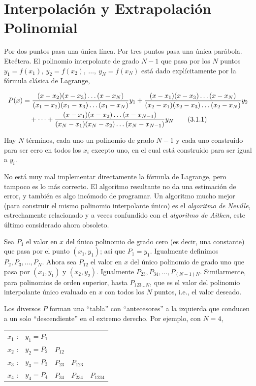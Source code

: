 \documentclass[10pt,a4paper]{book}
\begin{document}
\newpage

\section{Interpolación y Extrapolación Polinomial}

Por dos puntos pasa una única línea. Por tres puntos pasa una única parábola. Etcétera. El polinomio interpolante de grado $N - 1$ que pasa por los $N$ puntos $y_1 = f(x_1),\ y_2 = f(x_2),\ \ldots,\ y_N = f(x_N)$ está dado explícitamente por la fórmula clásica de Lagrange,

\begin{align}
P(x) &= \frac{(x - x_2)(x - x_3)\ldots(x - x_N)}{(x_1 - x_2)(x_1 - x_3)\ldots(x_1 - x_N)} y_1 
+ \frac{(x - x_1)(x - x_3)\ldots(x - x_N)}{(x_2 - x_1)(x_2 - x_3)\ldots(x_2 - x_N)} y_2 \notag \\
&\quad + \cdots + 
\frac{(x - x_1)(x - x_2)\ldots(x - x_{N-1})}{(x_N - x_1)(x_N - x_2)\ldots(x_N - x_{N-1})} y_N \tag{3.1.1}
\end{align}

Hay $N$ términos, cada uno un polinomio de grado $N - 1$ y cada uno construido para ser cero en todos los $x_i$ excepto uno, en el cual está construido para ser igual a $y_i$.

No está muy mal implementar directamente la fórmula de Lagrange, pero tampoco es lo más correcto. El algoritmo resultante no da una estimación de error, y también es algo incómodo de programar. Un algoritmo mucho mejor (para construir el mismo polinomio interpolante único) es el \textit{algoritmo de Neville}, estrechamente relacionado y a veces confundido con el \textit{algoritmo de Aitken}, este último considerado ahora obsoleto.

Sea $P_1$ el valor en $x$ del único polinomio de grado cero (es decir, una constante) que pasa por el punto $(x_1, y_1)$; así que $P_1 = y_1$. Igualmente definimos $P_2, P_3, \ldots, P_N$. Ahora sea $P_{12}$ el valor en $x$ del único polinomio de grado uno que pasa por $(x_1, y_1)$ y $(x_2, y_2)$. Igualmente $P_{23}, P_{34}, \ldots, P_{(N-1)N}$. Similarmente, para polinomios de orden superior, hasta $P_{123\ldots N}$, que es el valor del polinomio interpolante único evaluado en $x$ con todos los $N$ puntos, i.e., el valor deseado.

Los diversos $P$ forman una ``tabla'' con ``antecesores'' a la izquierda que conducen a un solo ``descendiente'' en el extremo derecho. Por ejemplo, con $N = 4$,

\begin{center}
\begin{tabular}{llll}
$x_1$ : & $y_1 = P_1$ \\
$x_2$ : & $y_2 = P_2$ & $P_{12}$ \\
$x_3$ : & $y_3 = P_3$ & $P_{23}$ & $P_{123}$ \\
$x_4$ : & $y_4 = P_4$ & $P_{34}$ & $P_{234}$ & $P_{1234}$
\end{tabular}
\end{center}
\end{document}
